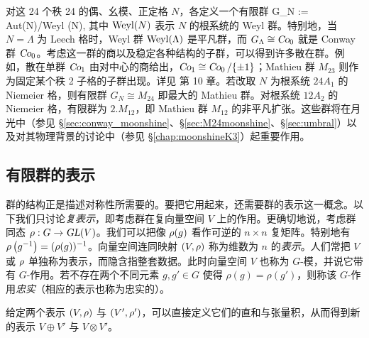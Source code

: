 
对这 24 个秩 24 的偶、幺模、正定格 $N$，各定义一个有限群
\be\label{def:niemeier_grp}
G_{N} := {\rm Aut}(N)/{\rm Weyl } (N), 
\ee
其中 ${\rm Weyl } (N)$ 表示 $N$ 的根系统的 Weyl 群。特别地，当 $N=\Lambda$ 为 Leech 格时，Weyl 群 ${\rm Weyl } (\Lambda)$ 是平凡群，而 $G_{\Lambda} \cong \operatorname{\textsl{Co}}_0$ 就是 Conway 群 $\operatorname{\textsl{Co}}_0$。考虑这一群的商以及稳定各种结构的子群，可以得到许多散在群。例如，散在单群 $\operatorname{\textsl{Co}}_1$ 由对中心的商给出，$\operatorname{\textsl{Co}}_1\cong \operatorname{\textsl{Co}}_0/\{\pm1\}$；Mathieu 群 $M_{23}$ 则作为固定某个秩 2 子格的子群出现。详见 \cite{sphere_packing} 第 10 章。若改取 $N$ 为根系统 $24A_1$ 的 Niemeier 格，则有限群 $G_{N}\cong M_{24}$ 即最大的 Mathieu 群。对根系统 $12A_2$ 的 Niemeier 格，有限群为 $2.M_{12}$，即 Mathieu 群 $M_{12}$ 的非平凡扩张。这些群将在月光中（参见 \S\ref{sec:conway_moonshine}、\S\ref{sec:M24moonshine}、\S\ref{sec:umbral}）以及对其物理背景的讨论中（参见 \S\ref{chap:moonshineK3}）起重要作用。


\subsection{有限群的表示}
\label{subsec:rep}

群的结构正是描述对称性所需要的。要把它用起来，还需要群的表示这一概念。以下我们只讨论\emph{复表示}，即考虑群在复向量空间 $V$ 上的作用。更确切地说，考虑群同态 $\rho:G\rightarrow\operatorname{\textsl{GL}}(V)$。我们可以把像 $\rho(g)$ 看作可逆的 $n\times n$ 复矩阵。特别地有 $\rho\left(g^{-1}\right)=(\rho(g))^{-1}$。向量空间连同映射 $(V,\rho)$ 称为维数为 $n$ 的\emph{表示}。人们常把 $V$ 或 $\rho$ 单独称为表示，而隐含指整套数据。此时向量空间 $V$ 也称为 $G$-模，并说它带有 $G$-作用。若不存在两个不同元素 $g,g'\in G$ 使得 $\rho(g)=\rho(g')$，则称该 $G$-作用\emph{忠实}（相应的表示也称为忠实的）。

给定两个表示 $(V,\rho)$ 与 $(V',\rho')$，可以直接定义它们的直和与张量积，从而得到新的表示 $V\oplus V'$ 与 $V\otimes V'$。

